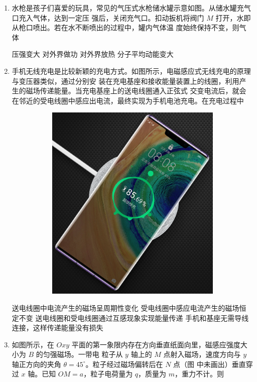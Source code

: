 \begin{enumerate}
\item
水枪是孩子们喜爱的玩具，常见的气压式水枪储水罐示意如图。从储水罐充气口充入气体，达到一定压
强后，关闭充气口。扣动扳机将阀门 $ M $ 打开，水即从枪口喷出。若在水不断喷出的过程中，罐内气体温
度始终保持不变，则气体  
\begin{figure}[h!]
\centering

\end{figure}


\fourchoices
{压强变大}
{对外界做功}
{对外界放热}
{分子平均动能变大}








\item
手机无线充电是比较新颖的充电方式。如图所示，电磁感应式无线充电的原理与变压器类似，通过分别安
装在充电基座和接收能量装置上的线圈，利用产生的磁场传递能量。当充电基座上的送电线圈通入正弦式
交变电流后，就会在邻近的受电线圈中感应出电流，最终实现为手机电池充电。在充电过程中  
\begin{figure}[h!]
\centering
\begin{subfigure}{0.4\linewidth}
\centering
\includegraphics[width=0.3\linewidth]{picture/screenshot054}
\caption{}\label{}
\end{subfigure}
\begin{subfigure}{0.4\linewidth}
\centering
 
\caption{}\label{}
\end{subfigure}
\end{figure}


\fourchoices
{送电线圈中电流产生的磁场呈周期性变化}
{受电线圈中感应电流产生的磁场恒定不变}
{送电线圈和受电线圈通过互感现象实现能量传递}
{手机和基座无需导线连接，这样传递能量没有损失}





\item
如图所示，在 $ Oxy $ 平面的第一象限内存在方向垂直纸面向里，磁感应强度大小为 $ B $ 的匀强磁场。一带电
粒子从 $ y $ 轴上的 $ M $ 点射入磁场，速度方向与 $ y $ 轴正方向的夹角 $ \theta=45 ^{ \circ } $。粒子经过磁场偏转后在 $ N $ 点（图
中未画出）垂直穿过 $ x $ 轴。已知 $ OM=a $，粒子电荷量为 $ q $，质量为 $ m $，重力不计。则  
\begin{figure}[h!]
\centering

\end{figure}



\end{enumerate}
